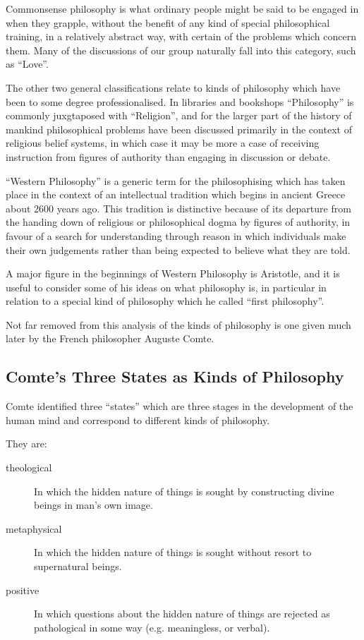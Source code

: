 \documentclass[10pt,titlepage]{article}
\begin{document}
Commonsense philosophy is what ordinary people might be said to be engaged in when they grapple, without the benefit of any kind of special philosophical training, in a relatively abstract way, with certain of the problems which concern them.
Many of the discussions of our group naturally fall into this category, such as ``Love''.

The other two general classifications relate to kinds of philosophy which have been to some degree professionalised.
In libraries and bookshops ``Philosophy'' is commonly juxgtaposed with ``Religion'', and for the larger part of the history of mankind philosophical problems have been discussed primarily in the context of religious belief systems, in which case it may be more a case of receiving instruction from figures of authority than engaging in discussion or debate.

``Western Philosophy'' is a generic term for the philosophising which has taken place in the context of an intellectual tradition which begins in ancient Greece about 2600 years ago.
This tradition is distinctive because of its departure from the handing down of religious or philosophical dogma by figures of authority, in favour of a search for understanding through reason in which individuals make their own judgements rather than being expected to believe what they are told. 

A major figure in the beginnings of Western Philosophy is Aristotle, and it is useful to consider some of his ideas on what philosophy is, in particular in relation to a special kind of philosophy which he called ``first philosophy''.

Not far removed from this analysis of the kinds of philosophy is one given much later by the French philosopher Auguste Comte.

\subsection{Comte's Three States as Kinds of Philosophy}

Comte identified three ``states'' which are three stages in the development of the human mind and correspond to different kinds of philosophy.

They are:

\begin{center}
\begin{description}
\item[theological]

    In which the hidden nature of things is sought by constructing divine beings in man's own image.

\item[metaphysical]

    In which the hidden nature of things is sought without resort to supernatural beings.

\item[positive]

    In which questions about the hidden nature of things are rejected as pathological in some way (e.g. meaningless, or verbal).
\end{description}
\end{center}
\end{document}
